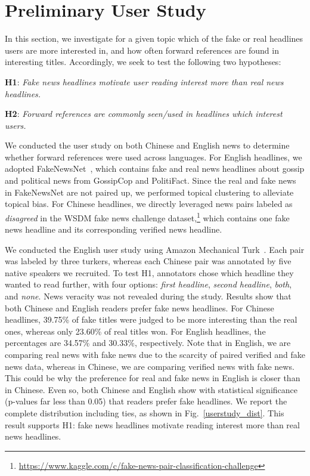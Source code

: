 \section{Preliminary User Study}\label{userstudy}
In this section, we investigate for a given topic which of the fake or real
headlines users are more interested in, and how often forward references are
found in interesting titles. Accordingly, we seek to test the following two hypotheses:

\noindent\textbf{H1}: \textit{Fake news headlines motivate user reading
	 interest more than real news headlines.}
  
\noindent\textbf{H2}: \textit{Forward references are commonly seen/used in headlines which interest users.}


We conducted the user study on both Chinese and English news to determine whether
forward references were used across languages.
For English headlines, we adopted FakeNewsNet~\cite{shu2018fakenewsnet}, which
contains fake and real news headlines about gossip and political news from
GossipCop and PolitiFact. Since the real and fake news in FakeNewsNet are not
paired up, we performed topical clustering to alleviate topical bias.  
For Chinese headlines, we directly leveraged news pairs labeled as
\textit{disagreed} in the WSDM fake news challenge
dataset,\footnote{\url{https://www.kaggle.com/c/fake-news-pair-classification-challenge}}
which contains one fake news headline and its corresponding verified news
headline. %

We conducted the English user study using Amazon Mechanical Turk~\cite{amturk}.
Each pair was labeled by three turkers, whereas each Chinese pair was annotated by
five native speakers we recruited. 
To test H1, annotators chose which headline they wanted to read further, with
four options: \emph{first headline}, \emph{second headline}, \emph{both}, and
\emph{none}. News veracity was not revealed during the study. 
Results show that both Chinese and English readers prefer fake news headlines.
For Chinese headlines, 39.75\% of fake titles were judged to be more
interesting than the real ones, whereas only 23.60\% of real titles won. For
English headlines, the percentages are 34.57\% and 30.33\%, respectively. Note
that in English, we are comparing real news with fake news due to the scarcity
of paired verified and fake news data, whereas in Chinese, we are comparing
verified news with fake news. This could be why the preference for
real and fake news in English is closer than in Chinese. Even so, both Chinese and
English show with statistical significance (p-values far less than 0.05) that
readers prefer fake headlines. We report the complete distribution including
ties, as shown in Fig.~\ref{userstudy_dist}.
This result supports H1: fake news headlines motivate reading interest more
than real news headlines.

